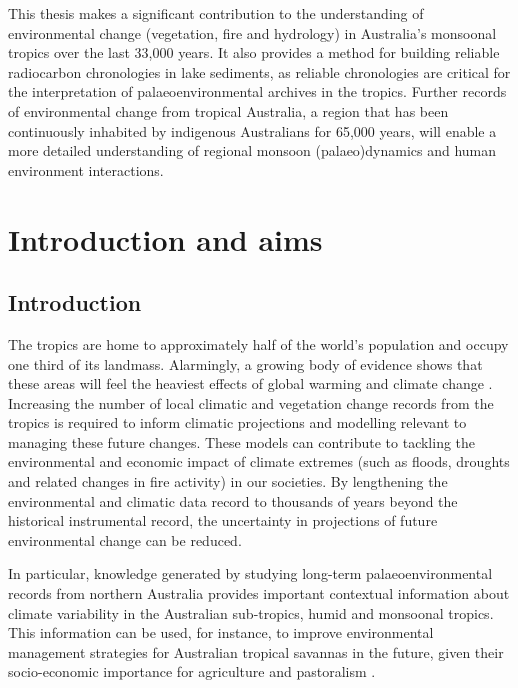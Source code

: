 \documentclass[
  12pt,
]{book}
\begin{document}
This thesis makes a significant contribution to the understanding of environmental change (vegetation, fire and hydrology) in Australia's monsoonal tropics over the last 33,000 years. It also provides a method for building reliable radiocarbon chronologies in lake sediments, as reliable chronologies are critical for the interpretation of palaeoenvironmental archives in the tropics. Further records of environmental change from tropical Australia, a region that has been continuously inhabited by indigenous Australians for 65,000 years, will enable a more detailed understanding of regional monsoon (palaeo)dynamics and human environment interactions.

\hypertarget{introduction-and-aims}{%
\chapter{Introduction and aims}\label{introduction-and-aims}}

\hypertarget{introduction}{%
\section{Introduction}\label{introduction}}

The tropics are home to approximately half of the world's population and occupy one third of its landmass. Alarmingly, a growing body of evidence shows that these areas will feel the heaviest effects of global warming and climate change \citep{wheelerClimateChangeImpacts2013, frankEffectsClimateExtremes2015, diffenbaughQuantifyingInfluenceGlobal2017}. Increasing the number of local climatic and vegetation change records from the tropics is required to inform climatic projections and modelling relevant to managing these future changes. These models can contribute to tackling the environmental and economic impact of climate extremes (such as floods, droughts and related changes in fire activity) in our societies. By lengthening the environmental and climatic data record to thousands of years beyond the historical instrumental record, the uncertainty in projections of future environmental change can be reduced.

In particular, knowledge generated by studying long-term palaeoenvironmental records from northern Australia provides important contextual information about climate variability in the Australian sub-tropics, humid and monsoonal tropics. This information can be used, for instance, to improve environmental management strategies for Australian tropical savannas in the future, given their socio-economic importance for agriculture and pastoralism \citep{stoecklKeyIndustriesAustralia2007}.
\end{document}
